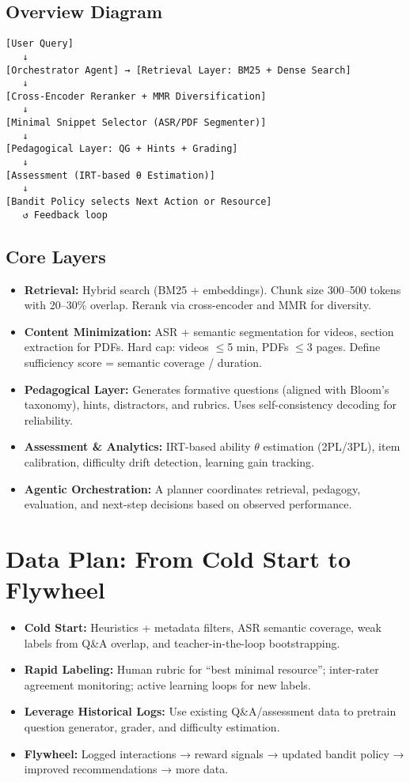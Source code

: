 \documentclass[12pt]{article}
\begin{document}
\subsection*{Overview Diagram}
\begin{verbatim}
[User Query] 
   ↓ 
[Orchestrator Agent] → [Retrieval Layer: BM25 + Dense Search]
   ↓ 
[Cross-Encoder Reranker + MMR Diversification]
   ↓ 
[Minimal Snippet Selector (ASR/PDF Segmenter)]
   ↓ 
[Pedagogical Layer: QG + Hints + Grading]
   ↓ 
[Assessment (IRT-based θ Estimation)]
   ↓ 
[Bandit Policy selects Next Action or Resource]
   ↺ Feedback loop
\end{verbatim}

\subsection*{Core Layers}
\begin{itemize}[leftmargin=1.2cm]
  \item \textbf{Retrieval:} Hybrid search (BM25 + embeddings). Chunk size 300–500 tokens with 20–30\% overlap. Rerank via cross-encoder and MMR for diversity.
  \item \textbf{Content Minimization:} ASR + semantic segmentation for videos, section extraction for PDFs. Hard cap: videos $\leq$5 min, PDFs $\leq$3 pages. Define sufficiency score = semantic coverage / duration.
  \item \textbf{Pedagogical Layer:} Generates formative questions (aligned with Bloom’s taxonomy), hints, distractors, and rubrics. Uses self-consistency decoding for reliability.
  \item \textbf{Assessment \& Analytics:} IRT-based ability $\theta$ estimation (2PL/3PL), item calibration, difficulty drift detection, learning gain tracking.
  \item \textbf{Agentic Orchestration:} A planner coordinates retrieval, pedagogy, evaluation, and next-step decisions based on observed performance.
\end{itemize}

\section{Data Plan: From Cold Start to Flywheel}
\begin{itemize}[leftmargin=1.2cm]
  \item \textbf{Cold Start:} Heuristics + metadata filters, ASR semantic coverage, weak labels from Q\&A overlap, and teacher-in-the-loop bootstrapping.
  \item \textbf{Rapid Labeling:} Human rubric for ``best minimal resource''; inter-rater agreement monitoring; active learning loops for new labels.
  \item \textbf{Leverage Historical Logs:} Use existing Q\&A/assessment data to pretrain question generator, grader, and difficulty estimation.
  \item \textbf{Flywheel:} Logged interactions → reward signals → updated bandit policy → improved recommendations → more data.
\end{itemize}
\end{document}
